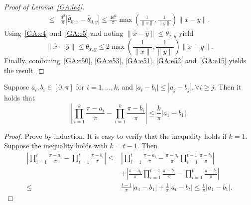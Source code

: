 \begin{proof}[Proof of Lemma~\ref{GA:le4}]
\begin{align}
\leq& \frac{d^2}{\pi} |\bar{\theta}_{0, x} - \bar{\theta}_{0, y}| \leq \frac{4 d^2}{\pi} \max\left(\frac{1}{\|x\|}, \frac{1}{\|y\|}\right) \|x - y\|. \label{GA:e52}
\end{align}
Using~\eqref{GA:e4} and~\eqref{GA:e5} and noting $\|\hat{x} - \hat{y}\| \leq \theta_{x, y}$ yield
\begin{equation} \label{GA:e15}
\|\hat{x} - \hat{y}\| \leq \theta_{x, y} \leq 2 \max\left( \frac{1}{\|x\|}, \frac{1}{\|y\|} \right) \|x - y\|.
\end{equation}
Finally, combining~\eqref{GA:e50}, \eqref{GA:e53}, \eqref{GA:e51}, \eqref{GA:e52} and~\eqref{GA:e15} yields the result.
\end{proof}

\begin{lemma} \label{GA:le17}
Suppose $a_i, b_i \in [0, \pi]$ for $i = 1, \ldots, k$, and $|a_i - b_i| \leq |a_j - b_j|, \forall i \geq j$. Then it holds that
\begin{equation*}
\left|\prod_{i = 1}^k \frac{\pi - a_i}{\pi} - \prod_{i = 1}^k \frac{\pi - b_i}{\pi}\right| \leq \frac{k}{\pi} |a_1 - b_1|.
\end{equation*}
\end{lemma}
\begin{proof}
Prove by induction. It is easy to verify that the inequality holds if $k = 1$.
Suppose the inequality holds with $k = t - 1$. Then
\begin{align*}
\left|\prod_{i = 1}^{t} \frac{\pi - a_i}{\pi} - \prod_{i = 1}^t \frac{\pi - b_i}{\pi}\right| \leq& \left|\prod_{i = 1}^{t} \frac{\pi - a_i}{\pi} - \frac{\pi - a_t}{\pi} \prod_{i = 1}^{t-1} \frac{\pi - b_i}{\pi}\right| \\
&+ \left|\frac{\pi - a_t}{\pi} \prod_{i = 1}^{t-1} \frac{\pi - b_i}{\pi} - \prod_{i = 1}^t \frac{\pi - b_i}{\pi}\right| \\
\leq& \frac{t-1}{\pi} |a_1 - b_1| + \frac{1}{\pi} |a_t - b_t| \leq \frac{t}{\pi} |a_1 - b_1|.
\end{align*}
\end{proof}